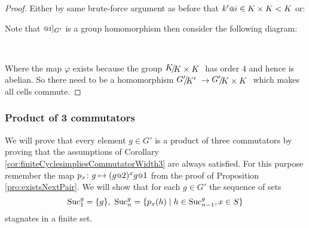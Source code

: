 \documentclass[a4paper,12pt]{article}
\begin{document}
\begin{proof}
 Either by same brute-force argument as before that $k'\at{i} \in K\times K < K$ or:
 
 Note that $\at{i}|_{G'}$ is a group homomorphism then consider the following diagram:
 
 \hfill
 \begin{xy}
\end{xy}\hfill\ 

Where the map $\varphi$ exists because the group $\RNK{K}{K\times K}$ has order $4$ and hence is abelian. So there need to be a homomorphism 
$\RNK{G'}{K'}\to \RNK{G'}{K\times K}$ which makes all cells commute.
\end{proof}
\subsubsection{Product of 3 commutators}
We will prove that every element $g\in G'$ is a product of three commutators by proving that the 
assumptions of Corollary \ref{cor:finiteCyclesimpliesCommutatorWidth3} are always satisfied. For this
purpose remember the map $p_x\colon g \mapsto (g\at{2})^x g\at{1}$ from the proof of Proposition \ref{pro:existsNextPair}.
We will show that for each $g\in G'$ the sequence of sets 
\[\textup{Suc}_1^g=\{g\},\ \textup{Suc}_n^g = \{p_x(h) \mid h\in \textup{Suc}_{n-1}^g, x\in S\} \]
stagnates in a finite set. 
\end{document}

